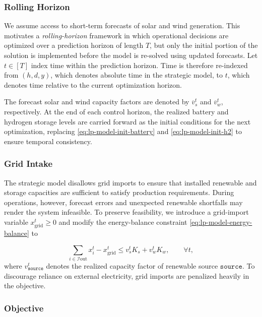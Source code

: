 \documentclass[11pt, letter]{article}
\begin{document}
\subsubsection{Rolling Horizon}

We assume access to short-term forecasts of solar and wind generation. This motivates a \emph{rolling-horizon} framework in which operational decisions are optimized over a prediction horizon of length $T$, but only the initial portion of the solution is implemented before the model is re-solved using updated forecasts. Let $t \in [T]$ index time within the prediction horizon. Time is therefore re-indexed from $(h,d,y)$, which denotes absolute time in the strategic model, to $t$, which denotes time relative to the current optimization horizon.

The forecast solar and wind capacity factors are denoted by $\overline v_s^t$ and $\overline v_w^t$, respectively. At the end of each control horizon, the realized battery and hydrogen storage levels are carried forward as the initial conditions for the next optimization, replacing \eqref{eq:lp-model-init-battery} and \eqref{eq:lp-model-init-h2} to ensure temporal consistency.

\subsubsection{Grid Intake}

The strategic model disallows grid imports to ensure that installed renewable and storage capacities are sufficient to satisfy production requirements. During operations, however, forecast errors and unexpected renewable shortfalls may render the system infeasible. To preserve feasibility, we introduce a grid-import variable $x_{\mathrm{grid}}^t \ge 0$ and modify the energy-balance constraint \eqref{eq:lp-model-energy-balance} to

\begin{equation}\label{eq:operational-balance}
   \sum_{i \in \mathcal{I}\text{out}} x_i^t - x_{\mathrm{grid}}^t
   \le
   v_s^t K_s + v_w^t K_w,
   \qquad \forall t,
\end{equation}
where $v_{\texttt{source}}^t$ denotes the realized capacity factor of renewable source $\texttt{source}$. To discourage reliance on external electricity, grid imports are penalized heavily in the objective.

\subsubsection{Objective}
\end{document}
